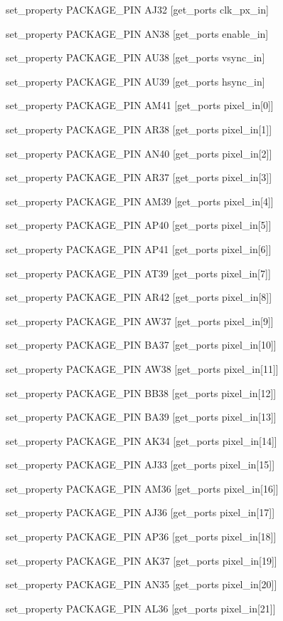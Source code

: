 \small{
set\_property PACKAGE\_PIN AJ32 [get\_ports clk\_px\_in]

set\_property PACKAGE\_PIN AN38 [get\_ports enable\_in]

set\_property PACKAGE\_PIN AU38 [get\_ports vsync\_in]

set\_property PACKAGE\_PIN AU39 [get\_ports hsync\_in]

set\_property PACKAGE\_PIN AM41 [get\_ports {pixel\_in[0]}]

set\_property PACKAGE\_PIN AR38 [get\_ports {pixel\_in[1]}]

set\_property PACKAGE\_PIN AN40 [get\_ports {pixel\_in[2]}]

set\_property PACKAGE\_PIN AR37 [get\_ports {pixel\_in[3]}]

set\_property PACKAGE\_PIN AM39 [get\_ports {pixel\_in[4]}]

set\_property PACKAGE\_PIN AP40 [get\_ports {pixel\_in[5]}]

set\_property PACKAGE\_PIN AP41 [get\_ports {pixel\_in[6]}]

set\_property PACKAGE\_PIN AT39 [get\_ports {pixel\_in[7]}]

set\_property PACKAGE\_PIN AR42 [get\_ports {pixel\_in[8]}]

set\_property PACKAGE\_PIN AW37 [get\_ports {pixel\_in[9]}]

set\_property PACKAGE\_PIN BA37 [get\_ports {pixel\_in[10]}]

set\_property PACKAGE\_PIN AW38 [get\_ports {pixel\_in[11]}]

set\_property PACKAGE\_PIN BB38 [get\_ports {pixel\_in[12]}]

set\_property PACKAGE\_PIN BA39 [get\_ports {pixel\_in[13]}]

set\_property PACKAGE\_PIN AK34 [get\_ports {pixel\_in[14]}]

set\_property PACKAGE\_PIN AJ33 [get\_ports {pixel\_in[15]}]

set\_property PACKAGE\_PIN AM36 [get\_ports {pixel\_in[16]}]

set\_property PACKAGE\_PIN AJ36 [get\_ports {pixel\_in[17]}]

set\_property PACKAGE\_PIN AP36 [get\_ports {pixel\_in[18]}]

set\_property PACKAGE\_PIN AK37 [get\_ports {pixel\_in[19]}]

set\_property PACKAGE\_PIN AN35 [get\_ports {pixel\_in[20]}]

set\_property PACKAGE\_PIN AL36 [get\_ports {pixel\_in[21]}]

}
